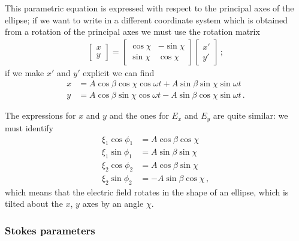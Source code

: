 \documentclass[main.tex]{subfiles}
\begin{document}

This parametric equation is expressed with respect to the principal axes of the ellipse; if we want to write in a different coordinate system which is obtained from a rotation of the principal axes we must use the rotation matrix 
%
\begin{align}
\left[\begin{array}{c}
x \\ 
y
\end{array}\right]
=
\left[\begin{array}{cc}
\cos \chi  & -\sin \chi   \\ 
\sin \chi  &  \cos \chi 
\end{array}\right]
\left[\begin{array}{c}
x' \\ 
y'
\end{array}\right]
\,;
\end{align}
%
if we make \(x'\) and \(y'\) explicit we can find 
%
\begin{align}
x &= A \cos \beta \cos \chi \cos \omega t + A \sin \beta \sin \chi \sin \omega t \\
y &= A \cos \beta \sin \chi \cos \omega t - A \sin \beta \cos \chi \sin \omega t 
\,.
\end{align}

The expressions for \(x\) and \(y\) and the ones for \(E_x\) and \(E_y\) are quite similar: we must identify 
%
\begin{align}
\xi_1 \cos \phi_1 &= A \cos \beta \cos \chi \\
\xi_1 \sin \phi_1 &= A \sin \beta \sin \chi \\
\xi_2 \cos \phi_2 &= A \cos \beta \sin \chi \\
\xi_2 \sin \phi_2 &= -A \sin \beta \cos \chi 
\,,
\end{align}
%
which means that the electric field rotates in the shape of an ellipse, which is tilted about the \(x\), \(y\) axes by an angle \(\chi \). 

\subsubsection{Stokes parameters}
\end{document}
